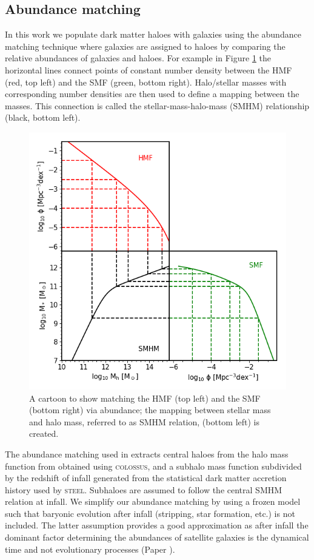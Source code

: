 \subsection{Abundance matching}
\label{C2:SubSec:AbnMtch}
In this work we populate dark matter haloes with galaxies using the abundance matching technique where galaxies are assigned to haloes by comparing the relative abundances of galaxies and haloes. For example in Figure \ref{fig:Abn_Toon} the horizontal lines connect points of constant number density between the HMF (red, top left) and the SMF (green, bottom right). Halo/stellar masses with corresponding number densities are then used to define a mapping between the masses. This connection is called the stellar-mass-halo-mass (SMHM) relationship (black, bottom left).

\begin{figure}[h]
    \centering
    \includegraphics[width = \linewidth]{Figures/Chapter2/AbundaceMatching.png}
    \caption{A cartoon to show matching the HMF (top left) and the SMF (bottom right) via abundance; the mapping between stellar mass and halo mass, referred to as SMHM relation, (bottom left) is created.}
    \label{fig:Abn_Toon}
\end{figure}

The abundance matching used in \steel extracts central haloes from the halo mass function from \citet{Despali2016TheDefinitions} obtained using \textsc{colossus}\cite{Diemer2018COLOSSUS:Halos}, and a subhalo mass function subdivided by the redshift of infall generated from the statistical dark matter accretion history used by \textsc{steel}. Subhaloes are assumed to follow the central SMHM relation at infall. We simplify our abundance matching by using a frozen model such that baryonic evolution after infall (stripping, star formation, etc.) is not included. The latter assumption provides a good approximation as after infall the dominant factor determining the abundances of satellite galaxies is the dynamical time and not evolutionary processes (Paper ).

